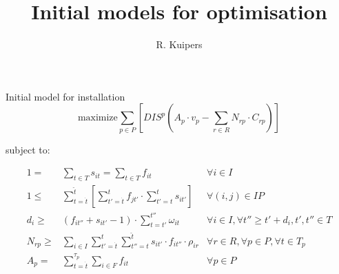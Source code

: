 \documentclass{beamer}
\title[Initial models for optimisation]{Initial models for optimisation}
\author{R. Kuipers}
\begin{document}
\begin{frame}
  \titlepage
\end{frame}

\begin{frame}{Initial model for installation}
\footnotesize
\begin{equation}
	\text{maximize} \sum_{p \in P} [ DIS^p (A_p \cdot v_p - \sum_{r \in R} N_{rp} \cdot C_{rp}) ]
\end{equation}

\bigskip
subject to:

\begin{align}
1 =& \sum_{t \in T} s_{it}	= \sum_{t \in T} f_{it}										&	\forall i \in I 						\\
1 \leq& \sum_{t = \dot{t}}^{\hat{t}} [ \sum_{t' = \dot{t}}^t f_{jt'} \cdot \sum_{t' = t}^{\hat{t}} s_{it'} ]	&	\forall (i, j) \in IP					\\
d_i \geq& (f_{it''} + s_{it'} - 1) \cdot \sum_{t = t'}^{t''} \omega_{it} 							& 	\forall i \in I, 	\forall t'' \geq t' + d_i, t', t'' \in T	\\
N_{rp} \geq& \sum_{i\in I} \sum_{t' = \dot{t}}^t \sum_{t'' = t}^{\hat{t}} s_{it'} \cdot f_{it''} \cdot \rho_{ir}	& 	\forall r \in R, \forall p \in P, \forall t \in T_p 	\\
A_p =&  \sum_{ t = \dot{t}}^{\tau_p} \sum_{i \in F} f_{it}									&	\forall p \in P
\end{align}

\end{frame}
\end{document}
